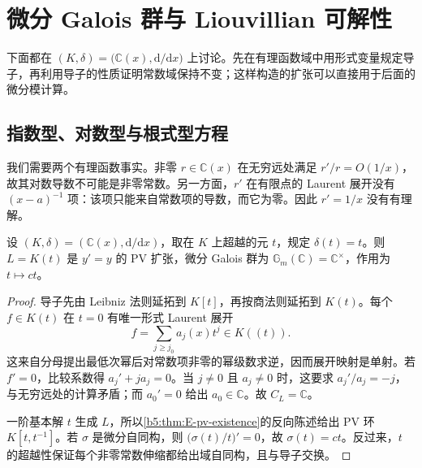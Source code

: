 %
%
\section{微分 Galois 群与 Liouvillian 可解性}
\label{b5:sec:E03}

下面都在 \((K,\delta)=\bigl(\mathbb C(x),\mathrm{d}/\mathrm{d}x\bigr)\) 上讨论。先在有理函数域中用形式变量规定导子，再利用导子的性质证明常数域保持不变；这样构造的扩张可以直接用于后面的微分模计算。

\subsection{指数型、对数型与根式型方程}
\label{b5:subsec:E03:01}

我们需要两个有理函数事实。非零 \(r\in\mathbb C(x)\) 在无穷远处满足 \(r'/r=O(1/x)\)，故其对数导数不可能是非零常数。另一方面，\(r'\) 在有限点的 Laurent 展开没有 \((x-a)^{-1}\) 项：该项只能来自常数项的导数，而它为零。因此 \(r'=1/x\) 没有有理解。

\begin{example}[指数型扩张]\label{b5:exm:E-exponential}
	设 \((K,\delta)=(\mathbb C(x),\mathrm d/\mathrm dx)\)，取在 \(K\) 上超越的元 \(t\)，规定 \(\delta(t)=t\)。则 \(L=K(t)\) 是 \(y'=y\) 的 PV 扩张，微分 Galois 群为 \(\mathbb G_m(\mathbb C)=\mathbb C^\times\)，作用为 \(t\mapsto ct\)。
\end{example}
\begin{proof}
	导子先由 Leibniz 法则延拓到 \(K[t]\)，再按商法则延拓到 \(K(t)\)。每个 \(f\in K(t)\) 在 \(t=0\) 有唯一形式 Laurent 展开
	\[
		f=\sum_{j\ge j_0}a_j(x)t^j\in K(\!(t)\!).
	\]
	这来自分母提出最低次幂后对常数项非零的幂级数求逆，因而展开映射是单射。若 \(f'=0\)，比较系数得 \(a_j'+ja_j=0\)。当 \(j\ne0\) 且 \(a_j\ne0\) 时，这要求 \(a_j'/a_j=-j\)，与无穷远处的计算矛盾；而 \(a_0'=0\) 给出 \(a_0\in\mathbb C\)。故 \(C_L=\mathbb C\)。

	一阶基本解 \(t\) 生成 \(L\)，所以\cref{b5:thm:E-pv-existence}的反向陈述给出 PV 环 \(K[t,t^{-1}]\)。若 \(\sigma\) 是微分自同构，则 \(\bigl(\sigma(t)/t\bigr)'=0\)，故 \(\sigma(t)=ct\)。反过来，\(t\) 的超越性保证每个非零常数伸缩都给出域自同构，且与导子交换。
\end{proof}

